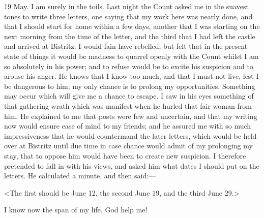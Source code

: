 \begin{diary}{19 May.}
I am surely in the toils. Last night the Count asked me in the suavest tones to write three letters, one saying that my work here was nearly done, and that I should start for home within a few days, another that I was starting on the next morning from the time of the letter, and the third that I had left the castle and arrived at Bistritz. I would fain have rebelled, but felt that in the present state of things it would be madness to quarrel openly with the Count whilst I am so absolutely in his power; and to refuse would be to excite his suspicion and to arouse his anger. He knows that I know too much, and that I must not live, lest I be dangerous to him; my only chance is to prolong my opportunities. Something may occur which will give me a chance to escape. I saw in his eyes something of that gathering wrath which was manifest when he hurled that fair woman from him. He explained to me that posts were few and uncertain, and that my writing now would ensure ease of mind to my friends; and he assured me with so much impressiveness that he would countermand the later letters, which would be held over at Bistritz until due time in case chance would admit of my prolonging my stay, that to oppose him would have been to create new suspicion. I therefore pretended to fall in with his views, and asked him what dates I should put on the letters. He calculated a minute, and then said:—

<The first should be June 12, the second June 19, and the third June 29.>

I know now the span of my life. God help me!
\end{diary}
 
